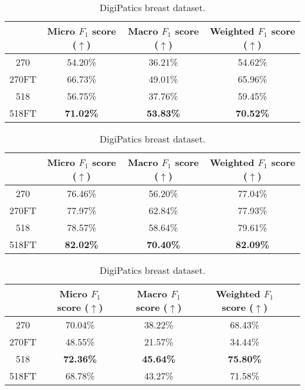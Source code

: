 \begin{table}[ht]
    \centering
    \caption{Result of the Scaling CNNs experiment.}
    \begin{tabular}{c|c|c|c|}
  \cline{2-4}
  & Micro $F_1$ score ($\uparrow$) & Macro $F_1$ score ($\uparrow$) & Weighted $F_1$ score ($\uparrow$) \\ \hline
\multicolumn{1}{|c|}{270}  & 54.20\% & 36.21\% & 54.62\% \\ \hline
\multicolumn{1}{|c|}{270FT}  & 66.73\% & 49.01\% & 65.96\% \\ \hline
\multicolumn{1}{|c|}{518}  & 56.75\% & 37.76\% & 59.45\% \\ \hline
\multicolumn{1}{|c|}{518FT}  & \textbf{71.02\%} & \textbf{53.83\%} & \textbf{70.52\%} \\ \hline
\end{tabular}
\caption{CoNSeP dataset.}
\label{tab:consep-scaling}


\vspace{0.5cm}

\begin{tabular}{c|c|c|c|}
  \cline{2-4}
  & Micro $F_1$ score ($\uparrow$) & Macro $F_1$ score ($\uparrow$) & Weighted $F_1$ score ($\uparrow$)  \\ \hline
\multicolumn{1}{|c|}{270}  & 76.46\% & 56.20\% & 77.04\% \\ \hline
\multicolumn{1}{|c|}{270FT}  & 77.97\% & 62.84\% & 77.93\% \\ \hline
\multicolumn{1}{|c|}{518}  & 78.57\% & 58.64\% & 79.61\% \\ \hline
\multicolumn{1}{|c|}{518FT}  & \textbf{82.02\%} & \textbf{70.40\%} & \textbf{82.09\%} \\ \hline
\end{tabular}
\caption{MoNuSAC dataset.}

\vspace{0.5cm}

\begin{tabular}{c|c|c|c|c|}
  \cline{2-4}
  & Micro $F_1$ score ($\uparrow$) & Macro $F_1$ score ($\uparrow$) & Weighted $F_1$ score ($\uparrow$) \\ \hline
\multicolumn{1}{|c|}{270}  & 70.04\% & 38.22\% & 68.43\%  \\ \hline
\multicolumn{1}{|c|}{270FT}  & 48.55\% & 21.57\% & 34.44\% \\ \hline
\multicolumn{1}{|c|}{518}  & \textbf{72.36\%} & \textbf{45.64\%} & \textbf{75.80\%} \\ \hline
\multicolumn{1}{|c|}{518FT}  & 68.78\% & 43.27\% & 71.58\% \\ \hline
\end{tabular}
\caption{DigiPatics breast dataset.}


\end{table}
